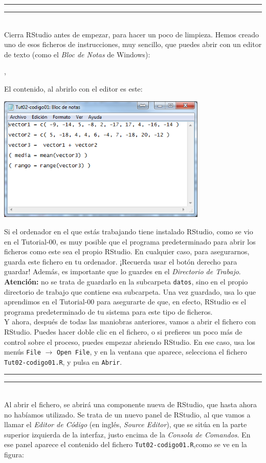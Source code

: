 \documentclass[10pt,a4paper]{article}\usepackage[]{graphicx}\usepackage[]{color}
\newcounter {cont01}
\begin{document}
\hrule
\hrule
\quad\\
Cierra RStudio antes de empezar, para hacer un poco de limpieza. Hemos creado uno de esos ficheros de instrucciones,  muy sencillo, que puedes  abrir con un editor de texto (como el {\em Bloc de Notas} de Windows):
\begin{center}
  ,
\end{center}
El contenido, al abrirlo con el editor es este:
    \begin{center}
    \includegraphics[height=6cm]{../fig/Tut02-18.png}
    \end{center}
Si el ordenador en el que estás trabajando tiene instalado RStudio, como se vio en el Tutorial-00, es muy posible que el programa predeterminado para abrir los ficheros como este sea el propio RStudio. En cualquier caso, para asegurarnos, guarda este fichero en tu ordenador. ¡Recuerda usar el botón derecho para guardar! Además, es importante que lo guardes en el {\em Directorio de Trabajo}. {\bf Atención:} no se trata de guardarlo en la subcarpeta {\tt datos}, sino en el propio directorio de trabajo que contiene esa subcarpeta. Una vez guardado, usa lo que aprendimos en el Tutorial-00 para asegurarte de que, en efecto, RStudio es el programa predeterminado de tu sistema para este tipo de ficheros.\\

Y ahora, después de todas las maniobras anteriores, vamos a abrir el fichero con RStudio.  Puedes hacer doble clic en el fichero, o si prefieres un poco más de control sobre el proceso, puedes empezar abriendo RStudio. En ese caso, usa los menús {\tt File} $\to$ {\tt Open File}, y en la ventana que aparece, selecciona el fichero {\tt Tut02-codigo01.R}, y pulsa en {\tt Abrir}.

\hrule
\hrule
\quad\\

Al abrir el fichero, se abrirá una componente nueva de RStudio, que hasta ahora no habíamos utilizado. Se trata de un nuevo panel de RStudio,  al que vamos a llamar el  {\em Editor de Código} (en inglés, {\em Source Editor}), que se sitúa en la parte superior izquierda de la interfaz, justo encima de la {\em Consola de Comandos}. En ese panel aparece el contenido del fichero {\tt Tut02-codigo01.R},como se ve en la figura:\\
\end{document}
